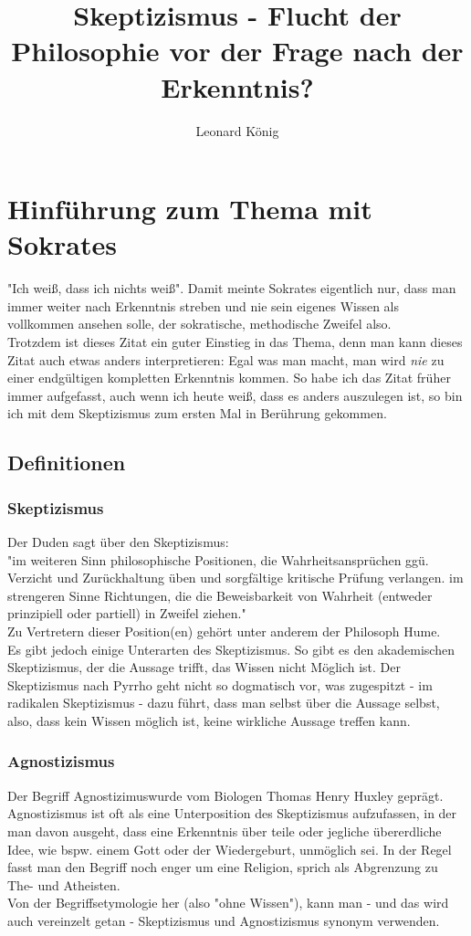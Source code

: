 \documentclass[12pt,a4paper]{article}
\author{Leonard König}
\title{Skeptizismus - Flucht der Philosophie vor der Frage nach der Erkenntnis?}
\begin{document}
\maketitle
\tableofcontents
\newpage
\section{Hinführung zum Thema mit Sokrates}
"Ich weiß, dass ich nichts weiß". Damit meinte Sokrates eigentlich nur, dass man immer weiter nach Erkenntnis streben und nie sein eigenes Wissen als vollkommen ansehen solle, der sokratische, methodische Zweifel also.%
\\Trotzdem ist dieses Zitat ein guter Einstieg in das Thema, denn man kann dieses Zitat auch etwas anders interpretieren: Egal was man macht, man wird \emph{nie} zu einer endgültigen kompletten Erkenntnis kommen.
So habe ich das Zitat früher immer aufgefasst, auch wenn ich heute weiß, dass es anders auszulegen ist, so bin ich mit dem Skeptizismus zum ersten Mal in Berührung gekommen.
	\subsection{Definitionen}
		\subsubsection{Skeptizismus}
Der Duden sagt über den Skeptizismus:\\
"im weiteren Sinn philosophische Positionen, die Wahrheitsansprüchen ggü. Verzicht und Zurückhaltung üben und sorgfältige kritische Prüfung verlangen.
im strengeren Sinne Richtungen, die die Beweisbarkeit von Wahrheit (entweder prinzipiell oder partiell) in Zweifel ziehen."%
\\Zu Vertretern dieser Position(en) gehört unter anderem 
der Philosoph Hume.\\%
Es gibt jedoch einige Unterarten des Skeptizismus. So gibt es den akademischen Skeptizismus, der die Aussage trifft, das Wissen nicht Möglich ist. Der Skeptizismus nach Pyrrho geht nicht so dogmatisch vor, was zugespitzt - im radikalen Skeptizismus - dazu führt, dass man selbst über die Aussage selbst, also, dass kein Wissen möglich ist, keine wirkliche Aussage treffen kann.%
		\subsubsection{Agnostizismus}
Der Begriff \glqq Agnostizimus\grqq wurde vom Biologen Thomas Henry Huxley geprägt. Agnostizismus ist oft als eine Unterposition des Skeptizismus aufzufassen, in der man davon ausgeht, dass eine Erkenntnis über teile oder jegliche übererdliche%
 Idee, wie bspw. einem Gott oder der Wiedergeburt, unmöglich sei. In der Regel fasst man den Begriff noch enger um eine Religion, sprich als Abgrenzung zu The- und Atheisten.\\ 
Von der Begriffsetymologie her (also "ohne Wissen"), kann man - und das wird auch vereinzelt getan - Skeptizismus und Agnostizismus synonym verwenden.
\end{document}
